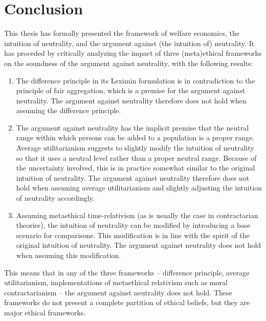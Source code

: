\chapter*{Conclusion}

This thesis has formally presented the framework of welfare economics, the intuition of neutrality, and the argument against (the intuition of) neutrality. It has proceded by critically analyzing the impact of three (meta)ethical frameworks on the soundness of the argument against neutrality, with the following results:
\begin{enumerate}
\item The difference principle in its Leximin formulation is in contradiction to the principle of fair aggregation, which is a premise for the argument against neutrality. The argument against neutrality therefore does not hold when assuming the difference principle. 
\item The argument against neutrality has the implicit premise that the neutral range within which persons can be added to a population is a proper range. Average utilitarianism suggests to slightly modify the intuition of neutrality so that it uses a neutral level rather than a proper neutral range. Because of the uncertainty involved, this is in practice somewhat similar to the original intuition of neutrality. The argument against neutrality therefore does not hold when assuming average utilitarianism and slightly adjusting the intuition of neutrality accordingly.
\item Assuming metaethical time-relativism (as is usually the case in contractarian theories), the intuition of neutrality can be modified by introducing a base scenario for comparisons. This modification is in line with the spirit of the original intuition of neutrality. The argument against neutrality does not hold when assuming this modification. 
\end{enumerate}

This means that in any of the three frameworks -- difference principle, average utilitarianism, implementations of metaethical relativism such as moral contractarianism -- the argument against neutrality does not hold. These frameworks do not present a complete partition of ethical beliefs, but they are major ethical frameworks. 

